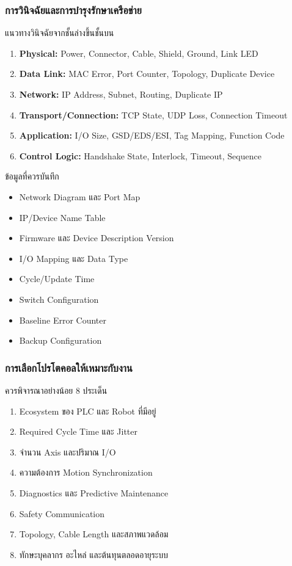 \subsubsection{การวินิจฉัยและการบำรุงรักษาเครือข่าย}

แนวทางวินิจฉัยจากชั้นล่างขึ้นชั้นบน

\begin{enumerate}
    \item \textbf{Physical:} Power, Connector, Cable, Shield, Ground, Link LED
    \item \textbf{Data Link:} MAC Error, Port Counter, Topology, Duplicate Device
    \item \textbf{Network:} IP Address, Subnet, Routing, Duplicate IP
    \item \textbf{Transport/Connection:} TCP State, UDP Loss, Connection Timeout
    \item \textbf{Application:} I/O Size, GSD/EDS/ESI, Tag Mapping, Function Code
    \item \textbf{Control Logic:} Handshake State, Interlock, Timeout, Sequence
\end{enumerate}

ข้อมูลที่ควรบันทึก

\begin{itemize}
    \item Network Diagram และ Port Map
    \item IP/Device Name Table
    \item Firmware และ Device Description Version
    \item I/O Mapping และ Data Type
    \item Cycle/Update Time
    \item Switch Configuration
    \item Baseline Error Counter
    \item Backup Configuration
\end{itemize}



\subsubsection{การเลือกโปรโตคอลให้เหมาะกับงาน}

ควรพิจารณาอย่างน้อย 8 ประเด็น

\begin{enumerate}
    \item Ecosystem ของ PLC และ Robot ที่มีอยู่
    \item Required Cycle Time และ Jitter
    \item จำนวน Axis และปริมาณ I/O
    \item ความต้องการ Motion Synchronization
    \item Diagnostics และ Predictive Maintenance
    \item Safety Communication
    \item Topology, Cable Length และสภาพแวดล้อม
    \item ทักษะบุคลากร อะไหล่ และต้นทุนตลอดอายุระบบ
\end{enumerate}


